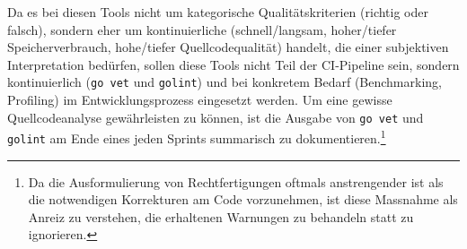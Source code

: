 Da es bei diesen Tools nicht um kategorische Qualitätskriterien (richtig oder falsch), sondern eher um kontinuierliche (schnell/langsam, hoher/tiefer Speicherverbrauch, hohe/tiefer Quellcodequalität) handelt, die einer subjektiven Interpretation bedürfen, sollen diese Tools nicht Teil der CI-Pipeline sein, sondern kontinuierlich (\texttt{go vet} und \texttt{golint}) und bei konkretem Bedarf (Benchmarking, Profiling) im Entwicklungsprozess eingesetzt werden. Um eine gewisse Quellcodeanalyse gewährleisten zu können, ist die Ausgabe von \texttt{go vet} und \texttt{golint} am Ende eines jeden Sprints summarisch zu dokumentieren.\footnote{Da die Ausformulierung von Rechtfertigungen oftmals anstrengender ist als die notwendigen Korrekturen am Code vorzunehmen, ist diese Massnahme als Anreiz zu verstehen, die erhaltenen Warnungen zu behandeln statt zu ignorieren.}
